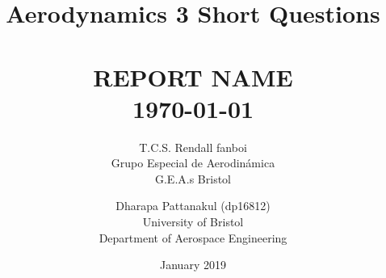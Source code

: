 \documentclass{article}
\title{Aerodynamics 3 Short Questions}
\date{January 2019}
\author{T.C.S. Rendall fanboi \Group \\ Grupo Especial de Aerodinámica \\ G.E.A.s Bristol}
\begin{document}
{\selectfont
\title{ \normalsize \textsc{}
		\\ [2.0cm]
		\HRule{0.5pt} \\
		\LARGE \textbf{\uppercase{Report Name}
		\HRule{2pt} \\ [0.5cm]
		\normalsize \today \vspace*{5\baselineskip}}
		}
}

\date{}

\author{
		Dharapa Pattanakul (dp16812) \\ 
		University of Bristol \\
		Department of Aerospace Engineering }

\maketitle
\newpage
\tableofcontents
\newpage
\end{document}
